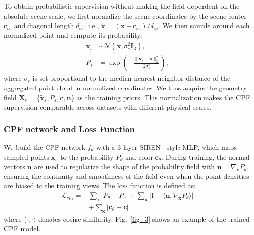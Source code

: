 \documentclass[lettersize,journal]{IEEEtran}
\begin{document}
To obtain probabilistic supervision without making the field dependent on the absolute scene scale, we first normalize the scene coordinates by the scene center $\mathbf{c}_{\mathrm{sc}}$ and diagonal length $d_{\mathrm{sc}}$, i.e., $\tilde{\mathbf{x}}=(\mathbf{x}-\mathbf{c}_{\mathrm{sc}})/d_{\mathrm{sc}}$. We then sample around each normalized point and compute its probability,
\begin{align}
    \tilde{\mathbf{x}}_{s} &\sim \mathcal{N}(\tilde{\mathbf{x}}, \sigma_s^2\mathbf{I}_3), \label{eq19} \\
    P_{s} &= \exp\left(-\frac{\|\tilde{\mathbf{x}}_{s}-\tilde{\mathbf{x}}\|_2^2}{2\sigma_s^2}\right), \label{eq20}
\end{align}
where $\sigma_s$ is set proportional to the median nearest-neighbor distance of the aggregated point cloud in normalized coordinates. We thus acquire the geometry field $\mathbf{X}_{s} = \{ \tilde{\mathbf{x}}_{s}, P_{s}, \mathbf{c}, \mathbf{n} \}$ as the training priors. This normalization makes the CPF supervision comparable across datasets with different physical scales.

\subsubsection{CPF network and Loss Function}

We build the CPF network $f_{\theta}$ with a 3-layer SIREN~\cite{implicit}-style MLP, which maps sampled points $\mathbf{x}_{s}$ to the probability $P_{\theta}$ and color $\mathbf{c}_{\theta}$.
During training, the normal vectors $\mathbf{n}$ are used to regularize the shape of the probability field with $\mathbf{n} = \nabla_{\mathbf{x}} P_{\theta}$, ensuring the continuity and smoothness of the field even when the point densities are biased to the training views. The loss function is defined as:
\begin{equation}
    \begin{aligned}
    \mathcal{L}_{cpf} = &\sum_{\mathbf{x}} \vert P_{\theta} - P_{s} \vert + \sum_{\mathbf{x}}  \vert 1 - \langle\mathbf{n}, \nabla_{\mathbf{x}} P_{\theta}\rangle \vert \\
    &+ \sum_{\mathbf{x}} \vert \mathbf{c}_{\theta} - \mathbf{c} \vert
    \end{aligned}
    \label{eq21}
\end{equation}
where $\langle\cdot,\cdot\rangle$ denotes cosine similarity. Fig.~\ref{fig_3} shows an example of the trained CPF model.
\end{document}
